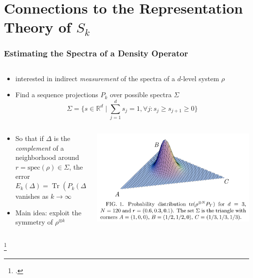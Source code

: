 \documentclass[
    9pt,
    hyperref={bookmarks=false, colorlinks=false}, %
    xcolor={dvipsnames},
]{beamer}
\DeclareMathOperator{\Tr}{Tr}
\begin{document}
\section{Connections to the Representation Theory of $S_k$}
\begin{frame}
    \frametitle{Estimating the Spectra of a Density Operator}
    \begin{columns}
        \begin{column}{\textwidth}
            \begin{itemize}
                \item \citeauthor{keyl2005estimating}\footnotemark{} interested in indirect \textit{measurement} of the spectra of a $d$-level system $\rho$
                \item Find a sequence projections $P_k$ over possible spectra $\Sigma$
                    \[ \Sigma = \{ s \in \mathbb R^d \mid \sum_{j=1}^{d} s_j = 1, \forall j : s_j \geq s_{j+1} \geq 0\} \]
            \end{itemize}
        \end{column}
    \end{columns}
    \begin{columns}
        \begin{column}{0.5\textwidth}
            \begin{itemize}
                \item So that if $\Delta$ is the \textit{complement} of a neighborhood around $r = \mathrm{spec}(\rho) \in \Sigma$, the error
                    \[ E_k(\Delta) = \Tr(P_k(\Delta) \rho^{\otimes k}) \]
                vanishes as $k \to \infty$
                \item Main idea: exploit the symmetry of $\rho^{\otimes k}$
            \end{itemize}
        \end{column}
        \begin{column}{0.5\textwidth}
            \includegraphics[width=\textwidth]{figures/keyl_werner.png}
        \end{column}
    \end{columns}
    \footcitetext{keyl2005estimating} 
\end{frame}
\end{document}
